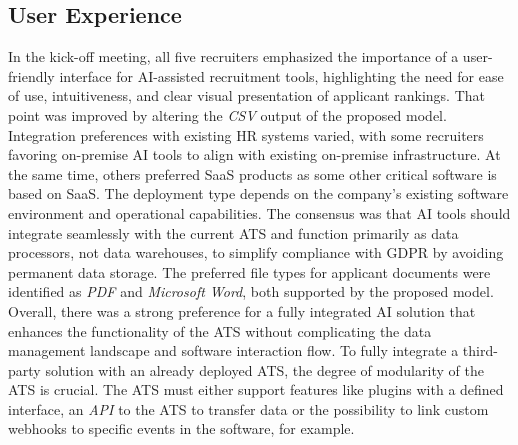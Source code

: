 \documentclass[draft,final]{thesisclass} %
\begin{document}
\subsection{User Experience}
In the kick-off meeting, all five recruiters emphasized the importance of a user-friendly interface for \acs{AI}-assisted recruitment tools, highlighting the need for ease of use, intuitiveness, and clear visual presentation of applicant rankings. That point was improved by altering the \textit{CSV} output of the proposed model. Integration preferences with existing \acs{HR} systems varied, with some recruiters favoring on-premise \acs{AI} tools to align with existing on-premise infrastructure. At the same time, others preferred \acs{SaaS} products as some other critical software is based on \acs{SaaS}. The deployment type depends on the company's existing software environment and operational capabilities. The consensus was that \acs{AI} tools should integrate seamlessly with the current \acs{ATS} and function primarily as data processors, not data warehouses, to simplify compliance with \acs{GDPR} by avoiding permanent data storage. The preferred file types for applicant documents were identified as \textit{PDF} and \textit{Microsoft Word}, both supported by the proposed model. Overall, there was a strong preference for a fully integrated \acs{AI} solution that enhances the functionality of the \acs{ATS} without complicating the data management landscape and software interaction flow. To fully integrate a third-party solution with an already deployed \acs{ATS}, the degree of modularity of the \acs{ATS} is crucial. The \acs{ATS} must either support features like plugins with a defined interface, an \textit{API} to the \acs{ATS} to transfer data or the possibility to link custom webhooks to specific events in the software, for example.
\end{document}
